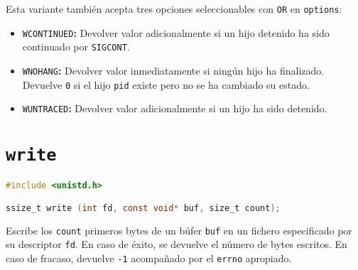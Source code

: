 Esta variante también acepta tres opciones seleccionables con \texttt{OR} en \texttt{options}:

\begin{itemize}
	\item\texttt{WCONTINUED}\textbf{:} Devolver valor adicionalmente si un hijo detenido ha sido continuado por \texttt{SIGCONT}.
	\item\texttt{WNOHANG}\textbf{:} Devolver valor inmediatamente si ningún hijo ha finalizado. Devuelve \texttt{0} si el hijo \texttt{pid} existe pero no se ha cambiado su estado.
	\item\texttt{WUNTRACED}\textbf{:} Devolver valor adicionalmente si un hijo ha sido detenido.
\end{itemize}

\section{\texttt{write}}\label{write}

\begin{lstlisting}[language=C]
#include <unistd.h>

ssize_t write (int fd, const void* buf, size_t count);
\end{lstlisting}

Escribe los \texttt{count} primeros bytes de un búfer \texttt{buf} en un fichero especificado por su descriptor \texttt{fd}.
En caso de éxito, se devuelve el número de bytes escritos.
En caso de fracaso, devuelve \texttt{-1} acompañado por el \texttt{errno} apropiado.
